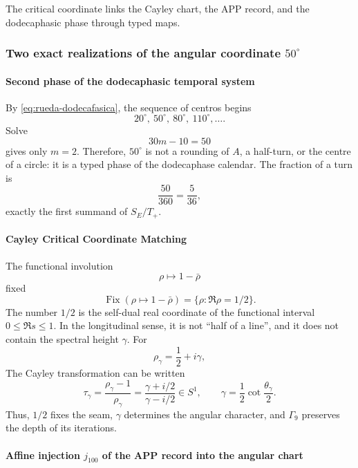 \noindent The critical coordinate links the Cayley chart, the APP record, and the dodecaphasic phase through typed maps.\par\medskip

\subsubsection{Two exact realizations of the angular coordinate \(50^\circ\)}

\paragraph{Second phase of the dodecaphasic temporal system}

By \eqref{eq:rueda-dodecafasica}, the sequence of centros begins
\[
20^\circ,\ 50^\circ,\ 80^\circ,\ 110^\circ,\ldots.
\]
Solve
\[
30m-10=50
\]
gives only \(m=2\). Therefore, \(50^\circ\) is not a rounding of \(A\),
a half-turn, or the centre of a circle: it is a typed phase of the
dodecaphase calendar. The fraction of a turn is
\[
\frac{50}{360}=\frac5{36},
\]
exactly the first summand of \(S_E/T_+\).

\paragraph{Cayley Critical Coordinate Matching}

The functional involution
\[
\rho\longmapsto1-\bar\rho
\]
fixed
\[
\operatorname{Fix}(\rho\mapsto1-\bar\rho)
=\{\rho:\Re\rho=1/2\}.
\]
The number \(1/2\) is the self-dual real coordinate of the functional interval \(0\leq\Re s\leq1\). In the longitudinal sense, it is not \enquote{half of a line}, and it does not contain the spectral height \(\gamma\). For
\[
\rho_\gamma=\frac12+i\gamma,
\]
The Cayley transformation can be written
\begin{equation}
\tau_\gamma
=\frac{\rho_\gamma-1}{\rho_\gamma}
=\frac{\gamma+i/2}{\gamma-i/2}
\in S^1,
\qquad
\gamma=\frac12\cot\frac{\theta_\gamma}{2}.
\label{eq:cayley-critica}
\end{equation}
Thus, \(1/2\) fixes the seam, \(\gamma\) determines the angular character, and
\(\Gamma_9\) preserves the depth of its iterations.

\paragraph{Affine injection \(j_{100}\) of the APP record into the angular chart}

